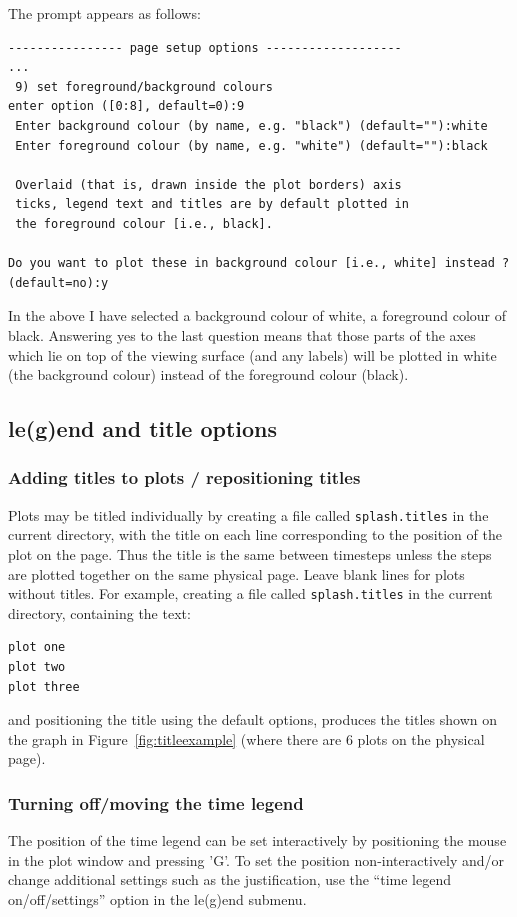\documentclass[a4paper,10pt]{article}
\begin{document}
 The prompt appears as follows:
\begin{verbatim}
---------------- page setup options -------------------
...
 9) set foreground/background colours 
enter option ([0:8], default=0):9
 Enter background colour (by name, e.g. "black") (default=""):white
 Enter foreground colour (by name, e.g. "white") (default=""):black

 Overlaid (that is, drawn inside the plot borders) axis 
 ticks, legend text and titles are by default plotted in 
 the foreground colour [i.e., black].

Do you want to plot these in background colour [i.e., white] instead ? (default=no):y
\end{verbatim}
 In the above I have selected a background colour of white, a foreground colour of black. Answering yes to the last question means that those parts of the axes which lie on top of the viewing surface (and any labels) will be plotted in white (the background colour) instead of the foreground colour (black). 
 
\subsection{le(g)end and title options}%

\subsubsection{ Adding titles to plots / repositioning titles}
\label{sec:title}
 Plots may be titled individually by creating a file called \verb+splash.titles+ in
the current directory, with the title on each line corresponding to the position
of the plot on the page. Thus the title is the same between timesteps unless the
steps are plotted together on the same physical page. Leave blank lines for
plots without titles. For example, creating a file called \verb+splash.titles+ in
the current directory, containing the text:
\begin{verbatim}
plot one
plot two
plot three
\end{verbatim}
and positioning the title using the default options, produces the titles shown
on the graph in Figure~\ref{fig:titleexample} (where there are 6 plots on the physical page).

\subsubsection{ Turning off/moving the time legend}
\label{sec:legendoff}
 The position of the time legend can be set interactively by positioning the mouse in the plot window and pressing 'G'. To set the position non-interactively and/or change additional settings such as the justification, use the ``time legend on/off/settings'' option in the le(g)end submenu.
\end{document}
